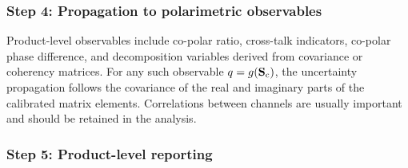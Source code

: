 

\subsubsection{Step 4: Propagation to polarimetric observables}

Product-level observables include co-polar ratio, cross-talk indicators,
co-polar phase difference, and decomposition variables derived from covariance
or coherency matrices. For any such observable $q = g(\mathbf{S}_{\rm c})$,
the uncertainty propagation follows the covariance of the real and imaginary
parts of the calibrated matrix elements. Correlations between channels are
usually important and should be retained in the analysis.

\subsubsection{Step 5: Product-level reporting}


